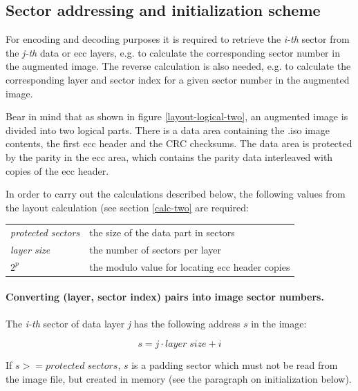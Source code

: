 \subsection{Sector addressing and initialization scheme}
\label{addressing-two}

For encoding and decoding purposes it is required to retrieve the
{\em i-th} sector from the {\em j-th} data or ecc layers, e.g. to calculate
the corresponding sector number in the augmented image. 
The reverse calculation is also needed, e.g. to calculate the
corresponding layer and sector index for a given sector number
in the augmented image.

\smallskip

Bear in mind that as shown in figure \ref{layout-logical-two}, an augmented image 
is divided into two logical parts. There is a data area containing 
the .iso image contents, the first ecc header and the CRC checksums.
The data area is protected by the parity in the ecc area, which contains
the parity data interleaved with copies of the ecc header. 

\smallskip

In order to carry out the calculations described below, the following
values from the layout calculation (see section \ref{calc-two} are required:

\bigskip

\begin{tabular}{lp{10cm}}
{\em protected sectors} & the size of the data part in sectors \\
{\em layer size} & the number of sectors per layer \\
{\em $2^p$} & the modulo value for locating ecc header copies \\
\end{tabular}

\paragraph{Converting (layer, sector index) pairs into image sector numbers.}

The {\em i-th} sector of data layer {\em j} has the following address $s$ in the image:

\[s = j \cdot layer\; size + i\]

If $s >= protected\; sectors$, $s$ is a padding sector which must not be read 
from the image file, but created in memory (see the paragraph on initialization below).

\bigskip

